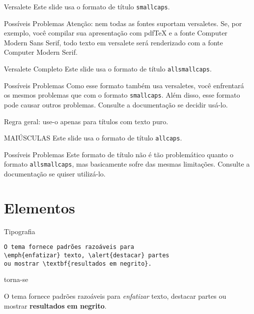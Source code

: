 {
\begin{frame}{Versalete}
	Este slide usa o formato de título \texttt{smallcaps}.

	\begin{alertblock}{Possíveis Problemas}
		Atenção: nem todas as fontes suportam versaletes. Se, por exemplo, você compilar sua apresentação com pdfTeX e a fonte Computer Modern Sans Serif, todo texto em versalete será renderizado com a fonte Computer Modern Serif.
	\end{alertblock}
\end{frame}
}

{
\begin{frame}{Versalete Completo}
	Este slide usa o formato de título \texttt{allsmallcaps}.

	\begin{alertblock}{Possíveis Problemas}
		Como esse formato também usa versaletes, você enfrentará os mesmos problemas que com o formato \texttt{smallcaps}. Além disso, esse formato pode causar outros problemas. Consulte a documentação se decidir usá-lo.

		Regra geral: use-o apenas para títulos com texto puro.
	\end{alertblock}
\end{frame}
}

{
\begin{frame}{MAIÚSCULAS}
	Este slide usa o formato de título \texttt{allcaps}.

	\begin{alertblock}{Possíveis Problemas}
		Este formato de título não é tão problemático quanto o formato \texttt{allsmallcaps}, mas basicamente sofre das mesmas limitações. Consulte a documentação se quiser utilizá-lo.
	\end{alertblock}
\end{frame}
}

\section{Elementos}

\begin{frame}[fragile]{Tipografia}
      \begin{verbatim}O tema fornece padrões razoáveis para
\emph{enfatizar} texto, \alert{destacar} partes
ou mostrar \textbf{resultados em negrito}.\end{verbatim}

  \begin{center}torna-se\end{center}

  O tema fornece padrões razoáveis para \emph{enfatizar} texto,
  \alert{destacar} partes ou mostrar \textbf{resultados em negrito}.
\end{frame}

